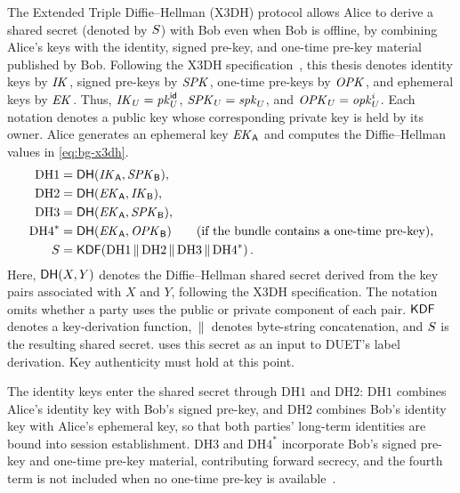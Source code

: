The Extended
Triple Diffie--Hellman (X3DH) protocol allows Alice to derive a shared secret
(denoted by $\sharedS$) with Bob even when Bob is offline, by combining Alice's
keys with the identity, signed pre-key, and one-time pre-key material published
by Bob. Following the X3DH specification~\cite[Section~2.4]{x3dh}, this thesis denotes identity keys by
$\xIK{}$, signed pre-keys by $\xSPK{}$, one-time pre-keys by $\xOPK{}$, and ephemeral keys by
$\xEK{}$. Thus, $\xIK{U}=\pkid{U}$, $\xSPK{U}=\spk{U}$, and
$\xOPK{U}=\opk{U}{i}$. Each notation denotes a public key whose corresponding private key is held by
its owner. Alice generates an ephemeral key $\xEK{\A}$ and computes the Diffie--Hellman
values in \cref{eq:bg-x3dh}.
\begin{equation}\label{eq:bg-x3dh}
\begin{aligned}
\mathrm{DH1}    &= \DH{\xIK{\A}}{\xSPK{\B}}, \\
\mathrm{DH2}    &= \DH{\xEK{\A}}{\xIK{\B}}, \\
\mathrm{DH3}    &= \DH{\xEK{\A}}{\xSPK{\B}}, \\
\mathrm{DH4}^{*} &= \DH{\xEK{\A}}{\xOPK{\B}}
   \qquad\text{(if the bundle contains a one-time pre-key)}, \\
\sharedS &= \KDF\!\left(\mathrm{DH1}\concat\mathrm{DH2}\concat\mathrm{DH3}
   \concat\mathrm{DH4}^{*}\right).
\end{aligned}
\end{equation}
Here, $\DH{X}{Y}$ denotes the Diffie--Hellman shared secret derived from the key pairs associated
with $X$ and $Y$, following the X3DH specification. The notation omits whether a party uses the
public or private component of each pair. $\KDF$ denotes a key-derivation function, $\concat$
denotes byte-string concatenation, and $\sharedS$ is the resulting shared secret. 
uses this secret as an input to DUET's label derivation. Key authenticity must hold at this point.

The identity keys enter the shared secret through $\mathrm{DH1}$ and
$\mathrm{DH2}$: $\mathrm{DH1}$ combines Alice's identity key with Bob's signed
pre-key, and $\mathrm{DH2}$ combines Bob's identity key with Alice's ephemeral
key, so that both parties' long-term identities are bound into session
establishment. $\mathrm{DH3}$ and $\mathrm{DH4}^{*}$ incorporate Bob's signed
pre-key and one-time pre-key material, contributing forward secrecy, and the
fourth term is not included when no one-time pre-key is
available~\cite[Section~3.3]{x3dh}.

